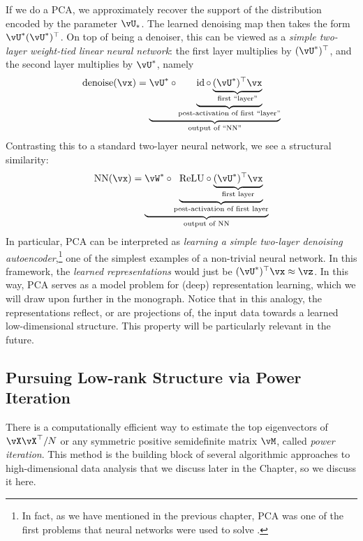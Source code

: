 \documentclass[../../book-main.tex]{subfiles}
\begin{document}
\begin{remark}
    If we do a PCA, we approximately recover the support of the distribution encoded by the parameter \(\vU_{\ast}\). The learned denoising map then takes the form \(\vU^{\ast}(\vU^{\ast})^{\top}\). On top of being a denoiser, this can be viewed as a \textit{simple two-layer weight-tied linear neural network}: the first layer multiplies by \((\vU^{\ast})^{\top}\), and the second layer multiplies by \(\vU^{\ast}\), namely
    \begin{equation}
        \operatorname{denoise}(\vx) = \underbrace{\vU^{\ast} \circ \underbrace{\id \circ \underbrace{(\vU^{\ast})^{\top}\vx}_{\text{first ``layer''}}}_{\text{post-activation of first ``layer''}}}_{\text{output of ``NN''}}
    \end{equation}
    Contrasting this to a standard two-layer neural network, we see a structural similarity:
    \begin{equation}
        \operatorname{NN}(\vx) = \underbrace{\vW^{\ast} \circ \underbrace{\mathrm{ReLU} \circ \underbrace{(\vU^{\ast})^{\top}\vx}_{\text{first layer}}}_{\text{post-activation of first layer}}}_{\text{output of NN}}
    \end{equation}
    In particular, PCA can be interpreted as \textit{learning a simple two-layer denoising autoencoder},\footnote{In fact, as we have mentioned in the previous chapter, PCA was one of the first problems that neural networks were used to solve \cite{Oja1982SimplifiedNM,Baldi89}.} one of the simplest examples of a non-trivial neural network. In this framework, the \textit{learned representations} would just be \((\vU^{\ast})^{\top}\vx \approx \vz\). In this way, PCA serves as a model problem for (deep) representation learning, which we will draw upon further in the monograph. Notice that in this analogy, the representations reflect, or are projections of, the input data towards a learned low-dimensional structure. This property will be particularly relevant in the future.
\end{remark}

\subsection{Pursuing Low-rank Structure via Power Iteration}\label{subsec:power iterations}

There is a computationally efficient way to estimate the top eigenvectors of \(\vX\vX^{\top}/N\) or any symmetric positive semidefinite matrix \(\vM\), called \textit{power iteration}. This method is the building block of several algorithmic approaches to high-dimensional data analysis that we discuss later in the Chapter, so we discuss it here. 
\end{document}
